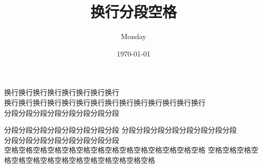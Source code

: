 \documentclass{article}
\title{换行分段空格}
\author{Monday}
\date{\today}
\begin{document}
\maketitle
换行换行换行换行换行换行换行换行\\换行换行换行换行换行换行换行\newline 换行换行换行换行换行换行换行\\
分段分段分段分段分段分段分段分段\par 分段分段分段分段分段分段分段分段
分段分段分段分段分段分段分段分段\\
分段分段分段分段分段分段分段分段\\
空格空格空格空格\hspace{1em}空格空格空格空格空格\hspace{0.5em}空格空格空格空格空格
\vspace{0.7em}
空格空格空格空格\hspace{1em}空格空格空格空格空格\hspace{0.5em}空格空格空格空格空格
\end{document}
